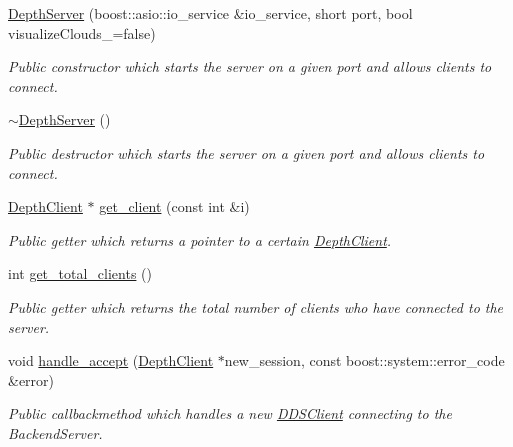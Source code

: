 \begin{DoxyCompactItemize}
\item 
\hyperlink{class_depth_server_a9ab59bd48e1280ee2dda1bdad4e6f8ff}{Depth\+Server} (boost\+::asio\+::io\+\_\+service \&io\+\_\+service, short port, bool visualize\+Clouds\+\_\+=false)
\begin{DoxyCompactList}\small\item\em Public constructor which starts the server on a given port and allows clients to connect. \end{DoxyCompactList}\item 
\hypertarget{class_depth_server_acf8fb886da8f5c4bd5b1c19e4267042a}{\hyperlink{class_depth_server_acf8fb886da8f5c4bd5b1c19e4267042a}{$\sim$\+Depth\+Server} ()}\label{class_depth_server_acf8fb886da8f5c4bd5b1c19e4267042a}

\begin{DoxyCompactList}\small\item\em Public destructor which starts the server on a given port and allows clients to connect. \end{DoxyCompactList}\item 
\hyperlink{class_depth_client}{Depth\+Client} $\ast$ \hyperlink{class_depth_server_a391a316cb888cee46324a137907c73f7}{get\+\_\+client} (const int \&i)
\begin{DoxyCompactList}\small\item\em Public getter which returns a pointer to a certain \hyperlink{class_depth_client}{Depth\+Client}. \end{DoxyCompactList}\item 
\hypertarget{class_depth_server_ad28c056c7576e2ff855e0d782d18b7e1}{int \hyperlink{class_depth_server_ad28c056c7576e2ff855e0d782d18b7e1}{get\+\_\+total\+\_\+clients} ()}\label{class_depth_server_ad28c056c7576e2ff855e0d782d18b7e1}

\begin{DoxyCompactList}\small\item\em Public getter which returns the total number of clients who have connected to the server. \end{DoxyCompactList}\item 
\hypertarget{class_depth_server_ae57fc68efb89381851e141be1dbe8ff2}{void \hyperlink{class_depth_server_ae57fc68efb89381851e141be1dbe8ff2}{handle\+\_\+accept} (\hyperlink{class_depth_client}{Depth\+Client} $\ast$new\+\_\+session, const boost\+::system\+::error\+\_\+code \&error)}\label{class_depth_server_ae57fc68efb89381851e141be1dbe8ff2}

\begin{DoxyCompactList}\small\item\em Public callbackmethod which handles a new \hyperlink{class_d_d_s_client}{D\+D\+S\+Client} connecting to the Backend\+Server. \end{DoxyCompactList}\end{DoxyCompactItemize}
